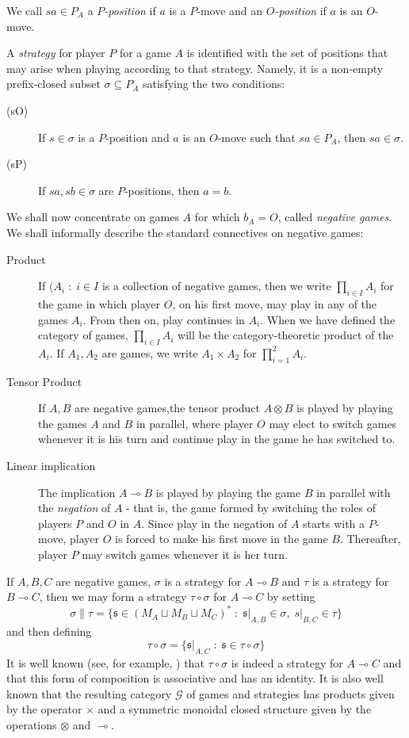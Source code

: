 \documentclass[a4paper,UKenglish]{lipics-v2016}
\theoremstyle{plain}
\theoremstyle{definition}
\newcommand{\tensor}{\otimes}
\renewcommand{\implies}{\multimap}
\newcommand{\comp}[2]{#1 \circ #2}
\newcommand{\cprd}{\sqcup}
\newcommand{\G}{\mathcal G}
\newcommand{\suchthat}{\;\colon\;}
\renewcommand{\subset}{\subseteq}
\newcommand{\s}{\mathfrak{s}}
\begin{document}
We call $sa\in P_A$ a \emph{$P$-position} if $a$ is a $P$-move and an \emph{$O$-position} if $a$ is an $O$-move.

A \emph{strategy} for player $P$ for a game $A$ is identified with the set of positions that may arise when playing according to that strategy.  Namely, it is a non-empty prefix-closed subset $\sigma\subset P_A$ satisfying the two conditions:
\begin{description}
  \item[(sO)] If $s\in\sigma$ is a $P$-position and $a$ is an $O$-move such that $sa\in P_A$, then $sa\in\sigma$.
  \item[(sP)] If $sa,sb\in\sigma$ are $P$-positions, then $a=b$.
\end{description}

We shall now concentrate on games $A$ for which $b_A=O$, called \emph{negative games}.  We shall informally describe the standard connectives on negative games:

\begin{description}
  \item[Product] If $(A_i\suchthat i\in I$ is a collection of negative games, then we write $\prod_{i\in I}A_i$ for the game in which player $O$, on his first move, may play in any of the games $A_i$.  From then on, play continues in $A_i$.  When we have defined the category of games, $\prod_{i\in I}A_i$ will be the category-theoretic product of the $A_i$.  If $A_1,A_2$ are games, we write $A_1\times A_2$ for $\prod_{i=1}^2 A_i$.  
  \item[Tensor Product] If $A,B$ are negative games,the tensor product $A\tensor B$ is played by playing the games $A$ and $B$ in parallel, where player $O$ may elect to switch games whenever it is his turn and continue play in the game he has switched to.
  \item[Linear implication] The implication $A\implies B$ is played by playing the game $B$ in parallel with the \emph{negation} of $A$ - that is, the game formed by switching the roles of players $P$ and $O$ in $A$.  Since play in the negation of $A$ starts with a $P$-move, player $O$ is forced to make his first move in the game $B$.  Thereafter, player $P$ may switch games whenever it is her turn.
\end{description}

If $A,B,C$ are negative games, $\sigma$ is a strategy for $A\implies B$ and $\tau$ is a strategy for $B\implies C$, then we may form a strategy $\comp\tau\sigma$ for $A\implies C$ by setting
\[
  \sigma\|\tau = \{\s\in (M_A\cprd M_B\cprd M_C)^*\suchthat \s\vert_{A,B}\in\sigma,\;s\vert_{B,C}\in\tau\}
  \]
and then defining
\[
  \comp\tau\sigma = \{\s\vert_{A,C}\suchthat\s\in\comp\tau\sigma\}
  \]
It is well known (see, for example, \cite{abramskyjagadeesangames}) that $\comp\tau\sigma$ is indeed a strategy for $A\implies C$ and that this form of composition is associative and has an identity.  It is also well known that the resulting category $\G$ of games and strategies has products given by the operator $\times$ and a symmetric monoidal closed structure given by the operations $\tensor$ and $\implies$.  
\end{document}
